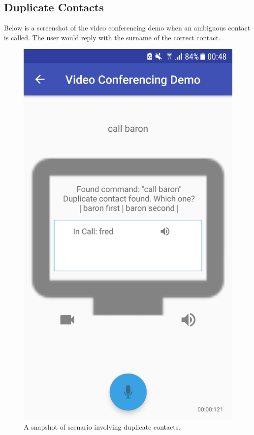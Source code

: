 \documentclass[11pt]{article}
\begin{document}
\begin{appendices}
\subsection{Duplicate Contacts}
\label{appendix:duplicate-contacts}
Below is a screenshot of the video conferencing demo when an ambiguous contact is called. The user would reply with the surname of the correct contact.

\begin{center}
\begin{figure}[H]
\begin{center}
  \includegraphics[scale=0.25]{duplicate-contacts.png}
  \caption{A snapshot of scenario involving duplicate contacts.}
  \label{fig:snapshot-duplicate-contacts}
  \end{center}
\end{figure}
\end{center}


\end{appendices}
\end{document}
